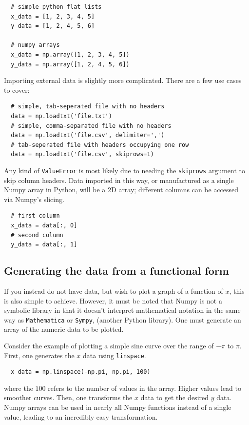 \documentclass{article}
\begin{document}
\begin{lstlisting}
  # simple python flat lists
  x_data = [1, 2, 3, 4, 5]
  y_data = [1, 2, 4, 5, 6]

  # numpy arrays
  x_data = np.array([1, 2, 3, 4, 5])
  y_data = np.array([1, 2, 4, 5, 6])
\end{lstlisting}

Importing external data is slightly more complicated. There are a few
use cases to cover:

\begin{lstlisting}
  # simple, tab-seperated file with no headers
  data = np.loadtxt('file.txt')
  # simple, comma-separated file with no headers
  data = np.loadtxt('file.csv', delimiter=',')
  # tab-seperated file with headers occupying one row
  data = np.loadtxt('file.csv', skiprows=1)
\end{lstlisting}

Any kind of \texttt{ValueError} is most likely due to needing the
\texttt{skiprows} argument to skip column headers. Data imported in
this way, or manufactured as a single Numpy array in Python, will be a
2D array; different columns can be accessed via Numpy's slicing.

\begin{lstlisting}
  # first column
  x_data = data[:, 0]
  # second column
  y_data = data[:, 1]
\end{lstlisting}

\subsection{Generating the data from a functional form}
If you instead do not have data, but wish to plot a graph of a
function of $x$, this is also simple to achieve. However, it must be
noted that Numpy is not a symbolic library in that it doesn't
interpret mathematical notation in the same way as
\texttt{Mathematica} or \texttt{Sympy}, (another Python library). One
must generate an array of the numeric data to be plotted.

Consider the example of plotting a simple sine curve over the range of
$-\pi$ to $\pi$. First, one generates the $x$ data using
\texttt{linspace}.

\begin{lstlisting}
  x_data = np.linspace(-np.pi, np.pi, 100) 
\end{lstlisting}

where the $100$ refers to the number of values in the array. Higher
values lead to smoother curves. Then, one transforms the $x$ data to
get the desired $y$ data. Numpy arrays can be used in nearly all Numpy
functions instead of a single value, leading to an incredibly easy
transformation.
\end{document}
